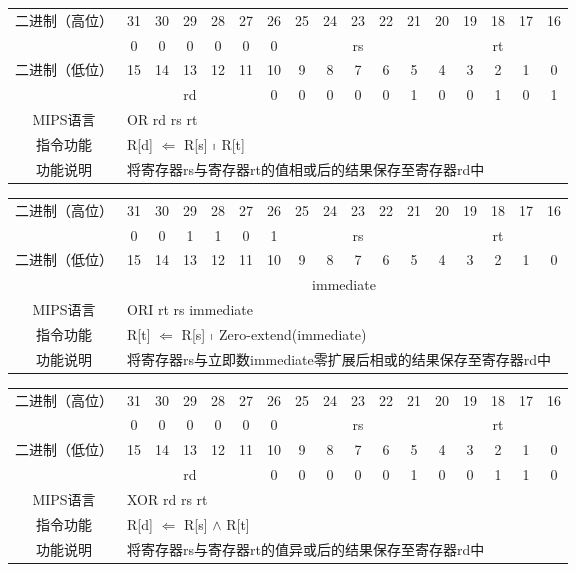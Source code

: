\begin{table}
\begin{tabular}{|c|c|c|c|c|c|c|c|c|c|c|c|c|c|c|c|c|}
\hline
\multirow{2}{*}{二进制（高位）} &
31&30&29&28&27&26&25&24&23&22&21&20&19&18&17&16\\
\cline{2-17}
&
0&0&0&0&0&
0&
\multicolumn{5}{c|}{rs}&
\multicolumn{5}{c|}{rt}\\
\hline
\multirow{2}{*}{二进制（低位）} &
15&14&13&12&11&10&9&8&7&6&5&4&3&2&1&0\\
\cline{2-17}
&
\multicolumn{5}{c|}{rd}&
0&0&0&0&0&
1&0&0&1&0&
1\\
\hline
MIPS语言&
\multicolumn{16}{l|}{OR rd rs rt}\\
\hline
指令功能&
\multicolumn{16}{l|}{R[d] $\Leftarrow$ R[s] $\shortmid$ R[t]}\\
\hline
功能说明&
\multicolumn{16}{l|}{将寄存器rs与寄存器rt的值相或后的结果保存至寄存器rd中}\\
\hline
\end{tabular}
\end{table}

\begin{table}
\begin{tabular}{|c|c|c|c|c|c|c|c|c|c|c|c|c|c|c|c|c|}
\hline
\multirow{2}{*}{二进制（高位）} &
31&30&29&28&27&26&25&24&23&22&21&20&19&18&17&16\\
\cline{2-17}
&
0&0&1&1&0&
1&
\multicolumn{5}{c|}{rs}&
\multicolumn{5}{c|}{rt}\\
\hline
\multirow{2}{*}{二进制（低位）} &
15&14&13&12&11&10&9&8&7&6&5&4&3&2&1&0\\
\cline{2-17}
&
\multicolumn{16}{c|}{immediate}\\
\hline
MIPS语言&
\multicolumn{16}{l|}{ORI rt rs immediate}\\
\hline
指令功能&
\multicolumn{16}{l|}{R[t] $\Leftarrow$ R[s] $\shortmid$ Zero-extend(immediate)}\\
\hline
功能说明&
\multicolumn{16}{l|}{将寄存器rs与立即数immediate零扩展后相或的结果保存至寄存器rd中}\\
\hline
\end{tabular}
\end{table}

\begin{table}
\begin{tabular}{|c|c|c|c|c|c|c|c|c|c|c|c|c|c|c|c|c|}
\hline
\multirow{2}{*}{二进制（高位）} &
31&30&29&28&27&26&25&24&23&22&21&20&19&18&17&16\\
\cline{2-17}
&
0&0&0&0&0&
0&
\multicolumn{5}{c|}{rs}&
\multicolumn{5}{c|}{rt}\\
\hline
\multirow{2}{*}{二进制（低位）} &
15&14&13&12&11&10&9&8&7&6&5&4&3&2&1&0\\
\cline{2-17}
&
\multicolumn{5}{c|}{rd}&
0&0&0&0&0&
1&0&0&1&1&
0\\
\hline
MIPS语言&
\multicolumn{16}{l|}{XOR rd rs rt}\\
\hline
指令功能&
\multicolumn{16}{l|}{R[d] $\Leftarrow$ R[s] $\land$ R[t]}\\
\hline
功能说明&
\multicolumn{16}{l|}{将寄存器rs与寄存器rt的值异或后的结果保存至寄存器rd中}\\
\hline
\end{tabular}
\end{table}

